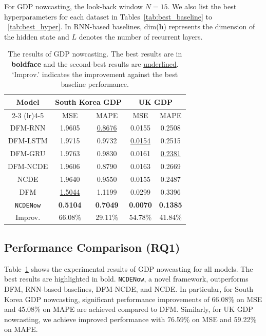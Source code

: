 \documentclass[sigconf]{acmart}
\begin{document}
For GDP nowcasting, the look-back window $N=15$. We also list the best hyperparameters for each dataset in Tables~\ref{tab:best_baseline} to ~\ref{tab:best_hyper}. In RNN-based baselines, dim($\mathbf{h}$) represents the dimension of the hidden state and $L$ denotes the number of recurrent layers.

\begin{table}[t]
    \small
    \centering
    \caption{The results of GDP nowcasting. The best results are in \textbf{boldface} and the second-best results are \underline{underlined}.
    `Improv.' indicates the improvement against the best baseline performance.}
    \label{tab:exp_nowcasting}
    \begin{tabular}{ccccc}
    \toprule
    \multirow{2}{*}{Model} & 
    \multicolumn{2}{c}{South Korea GDP} & 
    \multicolumn{2}{c}{UK GDP} \\ \cmidrule(lr){2-3} \cmidrule(lr){4-5}
     & \multicolumn{1}{c}{MSE} & 
     \multicolumn{1}{c}{MAPE} & 
     \multicolumn{1}{c}{MSE} & 
     \multicolumn{1}{c}{MAPE} \\ \midrule
    DFM-RNN & 1.9605 & \underline{0.8676} & 0.0155 & 0.2508 \\
    DFM-LSTM & 1.9715 & 0.9732 & \underline{0.0154} & 0.2515 \\
    DFM-GRU & 1.9763 & 0.9830 & 0.0161 & \underline{0.2381} \\
    DFM-NCDE & 1.9606 & 0.8790 & 0.0163 & 0.2669 \\
    NCDE & 1.9640 & 0.9550 & 0.0155 & 0.2487 \\
    DFM & \underline{1.5044} & 1.1199 & 0.0299 & 0.3396 \\ \midrule
    \texttt{NCDENow} & \textbf{0.5104} & \textbf{0.7049} & \textbf{0.0070} & \textbf{0.1385} \\ \midrule
    Improv. & 66.08\% & 29.11\% & 54.78\% & 41.84\% \\
    \bottomrule
    \end{tabular}
\end{table}

\subsection{Performance Comparison (RQ1)}\label{subsec:rq1}

Table~\ref{tab:exp_nowcasting} shows the experimental results of GDP nowcasting for all models. 
The best results are highlighted in bold. 
\texttt{NCDENow}, a novel framework, outperforms DFM, RNN-based baselines, DFM-NCDE, and NCDE. In particular, for South Korea GDP nowcasting, significant performance improvements of 66.08\% on MSE and 45.08\% on MAPE are achieved compared to DFM.
Similarly, for UK GDP nowcasting, we achieve improved performance with 76.59\% on MSE and 59.22\% on MAPE.
\end{document}
